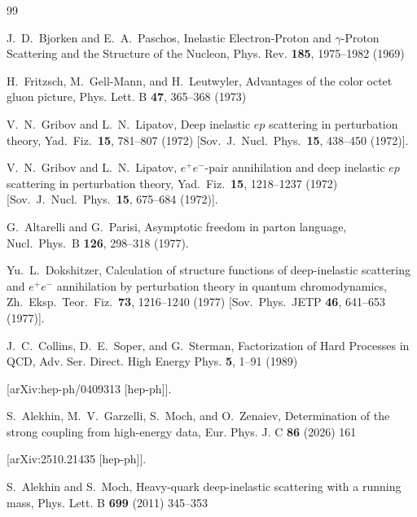 \documentclass[
 twocolumn,
 superscriptaddress,
 preprintnumbers,
 nofootinbib,
 amsmath,amssymb,
 aps,
 prl
 ]{revtex4-2}
\begin{document}
\begingroup\begin{thebibliography}{99}


J.~D.~Bjorken and E.~A.~Paschos,
Inelastic Electron-Proton and $\gamma$-Proton Scattering and the Structure of the Nucleon,
Phys. Rev. \textbf{185}, 1975--1982 (1969)




H.~Fritzsch, M.~Gell-Mann, and H.~Leutwyler,
Advantages of the color octet gluon picture,
Phys. Lett. B \textbf{47}, 365--368 (1973)




  V.~N.~Gribov and L.~N.~Lipatov,
  Deep inelastic $ep$ scattering in perturbation theory,
  Yad.\ Fiz.\  {\bf 15}, 781--807 (1972)
  [Sov.\ J.\ Nucl.\ Phys.\  {\bf 15}, 438--450 (1972)].




  V.~N.~Gribov and L.~N.~Lipatov,
  $e^+e^-$-pair annihilation and deep inelastic $ep$ scattering in perturbation theory,
  Yad.\ Fiz.\ {\bf 15}, 1218--1237 (1972)
  [Sov.\ J.\ Nucl.\ Phys.\ {\bf 15}, 675--684 (1972)].




  G.~Altarelli and G.~Parisi,
  Asymptotic freedom in parton language,
  Nucl.\ Phys.\ B {\bf 126}, 298--318 (1977).





  Yu.~L.~Dokshitzer,
  Calculation of structure functions of deep-inelastic scattering and $e^+ e^-$ annihilation by perturbation theory in quantum chromodynamics,
  Zh.\ Eksp.\ Teor.\ Fiz.\  {\bf 73}, 1216--1240 (1977)
  [Sov.\ Phys.\ JETP {\bf 46}, 641--653 (1977)].




J.~C.~Collins, D.~E.~Soper, and G.~Sterman,
Factorization of Hard Processes in QCD,
Adv. Ser. Direct. High Energy Phys. \textbf{5}, 1--91 (1989)

[arXiv:hep-ph/0409313 [hep-ph]].



S.~Alekhin, M.~V.~Garzelli, S.~Moch, and O.~Zenaiev,
Determination of the strong coupling from high-energy data,
Eur. Phys. J. C \textbf{86} (2026) 161

[arXiv:2510.21435 [hep-ph]].



S.~Alekhin and S.~Moch,
Heavy-quark deep-inelastic scattering with a running mass,
Phys. Lett. B \textbf{699} (2011) 345--353


\end{thebibliography}
\end{document}
